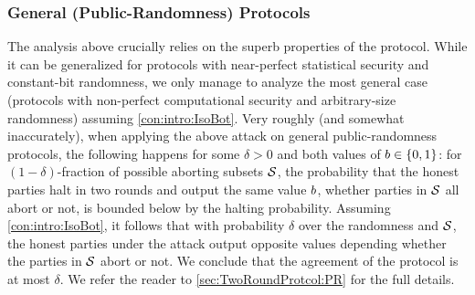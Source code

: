 \subsubsection{General (Public-Randomness) Protocols}\label{sec:technique:3:2}
The analysis above crucially relies on the superb properties of the protocol. While it can be generalized for protocols with near-perfect statistical security and constant-bit randomness, we only manage to analyze the most general case (\ie protocols with non-perfect computational security and arbitrary-size randomness) assuming \cref{con:intro:IsoBot}. Very roughly (and somewhat inaccurately), when applying the above attack on general public-randomness protocols, the following happens for some $\delta>0$ and both values of $b\in \{0,1\}$: for $(1-\delta)$-fraction of possible aborting subsets $\mathcal{S}$, the probability that the honest parties halt in two rounds and output the same value $b$, whether parties in $\mathcal{S}$ all abort or not, is bounded below by the halting probability. Assuming \cref{con:intro:IsoBot}, it follows that with probability $\delta$ over the randomness and $\mathcal{S}$, the honest parties under the attack output opposite values depending whether the parties in ${\cal{S}}$ abort or not. We conclude that the agreement of the protocol is at most $\delta$. We refer the reader to \cref{sec:TwoRoundProtcol:PR} for the full details.

